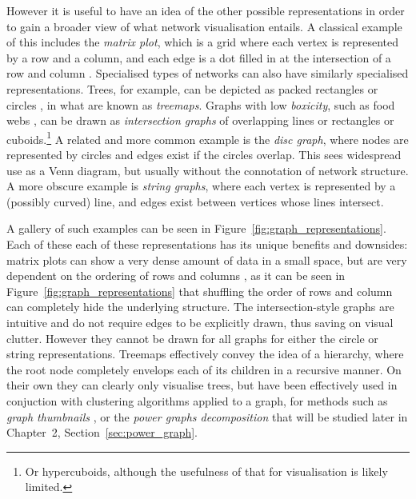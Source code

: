 However it is useful to have an idea of the other possible representations in order to gain a broader view of what network visualisation entails. A classical example of this includes the \emph{matrix plot}, which is a grid where each vertex is represented by a row and a column, and each edge is a dot filled in at the intersection of a row and column \cite{Liiv2010}.
Specialised types of networks can also have similarly specialised representations. Trees, for example, can be depicted as packed rectangles \cite{Johnson1991} or circles \cite{Wang2006}, in what are known as \emph{treemaps}.
Graphs with low \emph{boxicity}, such as food webs \cite{Eklof2013}, can be drawn as \emph{intersection graphs} of overlapping lines or rectangles or cuboids.\footnote{Or hypercuboids, although the usefulness of that for visualisation is likely limited.}
A related and more common example is the \emph{disc graph}, where nodes are represented by circles and edges exist if the circles overlap. This sees widespread use as a Venn diagram, but usually without the connotation of network structure.
A more obscure example is \emph{string graphs}, where each vertex is represented by a (possibly curved) line, and edges exist between vertices whose lines intersect.

A gallery of such examples can be seen in Figure~\ref{fig:graph_representations}.
Each of these each of these representations has its unique benefits and downsides: matrix plots can show a very dense amount of data in a small space, but are very dependent on the ordering of rows and columns \cite{Liiv2010}, as it can be seen in Figure~\ref{fig:graph_representations} that shuffling the order of rows and column can completely hide the underlying structure.
The intersection-style graphs are intuitive and do not require edges to be explicitly drawn, thus saving on visual clutter. However they cannot be drawn for all graphs for either the circle \cite{McDiarmid2014} or string \cite{Schaefer2003} representations.
Treemaps effectively convey the idea of a hierarchy, where the root node completely envelops each of its children in a recursive manner. On their own they can clearly only visualise trees, but have been effectively used in conjuction with clustering algorithms applied to a graph, for methods such as \emph{graph thumbnails} \cite{Yoghourdjian2018}, or the \emph{power graphs decomposition} \cite{Dwyer2014} that will be studied later in Chapter~2, Section~\ref{sec:power_graph}.
  

